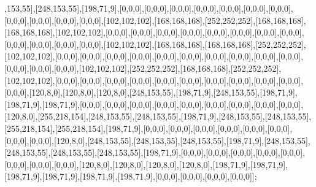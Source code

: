,153,55],[248,153,55],[198,71,9],[0,0,0],[0,0,0],[0,0,0],[0,0,0],[0,0,0],[0,0,0],[0,0,0],[0,0,0],[0,0,0],[0,0,0],[0,0,0],[102,102,102],[168,168,168],[252,252,252],[168,168,168],[168,168,168],[102,102,102],[0,0,0],[0,0,0],[0,0,0],[0,0,0],[0,0,0],[0,0,0],[0,0,0],[0,0,0],[0,0,0],[0,0,0],[0,0,0],[0,0,0],[102,102,102],[168,168,168],[168,168,168],[252,252,252],[102,102,102],[0,0,0],[0,0,0],[0,0,0],[0,0,0],[0,0,0],[0,0,0],[0,0,0],[0,0,0],[0,0,0],[0,0,0],[0,0,0],[0,0,0],[0,0,0],[102,102,102],[252,252,252],[168,168,168],[252,252,252],[102,102,102],[0,0,0],[0,0,0],[0,0,0],[0,0,0],[0,0,0],[0,0,0],[0,0,0],[0,0,0],[0,0,0],[0,0,0],[0,0,0],[120,8,0],[120,8,0],[120,8,0],[248,153,55],[198,71,9],[248,153,55],[198,71,9],[198,71,9],[198,71,9],[0,0,0],[0,0,0],[0,0,0],[0,0,0],[0,0,0],[0,0,0],[0,0,0],[0,0,0],[0,0,0],[120,8,0],[255,218,154],[248,153,55],[248,153,55],[198,71,9],[248,153,55],[248,153,55],[255,218,154],[255,218,154],[198,71,9],[0,0,0],[0,0,0],[0,0,0],[0,0,0],[0,0,0],[0,0,0],[0,0,0],[0,0,0],[120,8,0],[248,153,55],[248,153,55],[248,153,55],[198,71,9],[248,153,55],[248,153,55],[248,153,55],[248,153,55],[198,71,9],[0,0,0],[0,0,0],[0,0,0],[0,0,0],[0,0,0],[0,0,0],[0,0,0],[0,0,0],[120,8,0],[120,8,0],[120,8,0],[120,8,0],[198,71,9],[198,71,9],[198,71,9],[198,71,9],[198,71,9],[198,71,9],[0,0,0],[0,0,0],[0,0,0],[0,0,0]];


